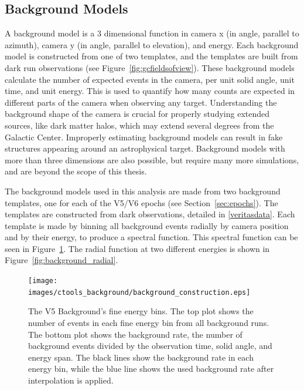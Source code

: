   \FloatBarrier
  
  \subsection{Background Models}\label{background_production}
  
    A background model is a 3 dimensional function in camera x (in angle, parallel to azimuth), camera y (in angle, parallel to elevation), and energy.
    Each background model is constructed from one of two templates, and the templates are built from dark run observations (see Figure~\ref{fig:gcfieldsofview}).
    These background models calculate the number of expected events in the camera, per unit solid angle, unit time, and unit energy.
    This is used to quantify how many counts are expected in different parts of the camera when observing any target.
    Understanding the background shape of the camera is crucial for properly studying extended sources, like dark matter halos, which may extend several degrees from the Galactic Center.
    Improperly estimating background models can result in fake structures appearing around an astrophysical target.
    Background models with more than three dimensions are also possible, but require many more simulations, and are beyond the scope of this thesis.
    
    The background models used in this analysis are made from two background templates, one for each of the V5/V6 epochs (see Section~\ref{sec:epochs}).
    The templates are constructed from dark observations, detailed in \ref{veritasdata}.
    Each template is made by binning all background events radially by camera position and by their energy, to produce a spectral function.
    This spectral function can be seen in Figure~\ref{fig:background_profile}.
    The radial function at two different energies is shown in Figure~\ref{fig:background_radial}.

    \begin{figure}[!p]
      \centering
      \texttt{[image: images/ctools\_background/background\_construction.eps]}
      \caption[CTOOLS Background Fine Energy Bins]{
        The V5 Background's fine energy bins.
        The top plot shows the number of events in each fine energy bin from all background runs.
        The bottom plot shows the background rate, the number of background events divided by the observation time, solid angle, and energy span.
        The black lines show the background rate in each energy bin, while the blue line shows the used background rate after interpolation is applied.
      }
      \label{fig:background_profile}
    \end{figure}

